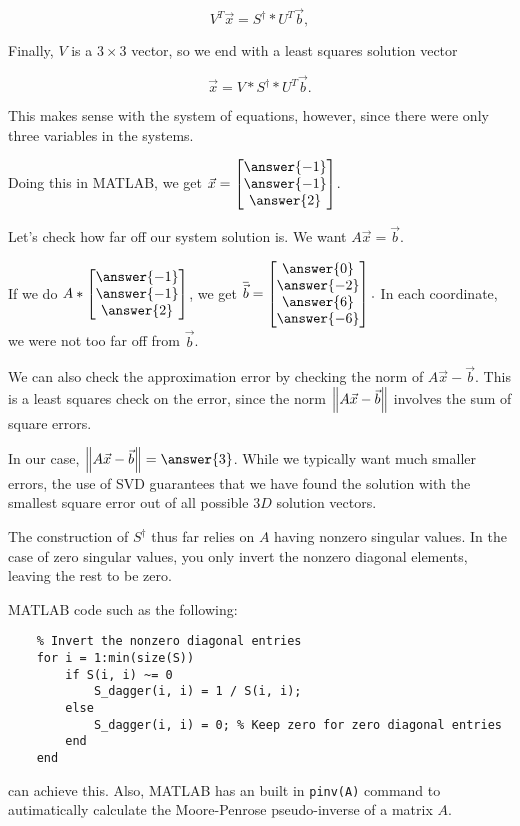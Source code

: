 \documentclass{ximera}
\begin{document}
\begin{example}
$$V^T\vec{x}=S^\dagger*U^T\vec{b},$$

Finally, $V$ is a $3\times 3$ vector, so we end with a least squares solution vector

$$\vec{x}=V*S^\dagger*U^T\vec{b}.$$

This makes sense with the system of equations, however, since there were only three variables in the systems. 

Doing this in MATLAB, we get $\vec{x}=\begin{bmatrix}
  \answer{-1}\\\answer{-1}\\\answer{2}
\end{bmatrix}$. 

Let's check how far off our system solution is. We want $A\vec{x}=\vec{b}$. 

If we do \( A*\begin{bmatrix}
  \answer{-1}\\\answer{-1}\\\answer{2}
\end{bmatrix} \), we get \( \overline{\vec{b}}=\begin{bmatrix}
  \answer{0}\\\answer{-2}\\\answer{6}\\\answer{-6}
\end{bmatrix}. \) In each coordinate, we were not too far off from $\vec{b}$. 



We can also check the approximation error by checking the norm of $A\vec{x}-\vec{b}$. This is a least squares check on the error, since the norm $\left\|A\vec{x}-\vec{b}\right\|$ involves the sum of square errors. 

In our case, $\norm{A\vect{x}-\vect{b}}=\answer{3}$. While we typically want much smaller errors, the use of SVD guarantees that we have found the solution with the smallest square error out of all possible $3D$ solution vectors. 

\end{example}

\begin{remark}

  The construction of $S^\dagger$ thus far relies on $A$ having nonzero singular values. In the case of zero singular values, you only invert the nonzero diagonal elements, leaving the rest to be zero. 

  MATLAB code such as the following:

  \begin{verbatim}
    % Invert the nonzero diagonal entries
    for i = 1:min(size(S))
        if S(i, i) ~= 0
            S_dagger(i, i) = 1 / S(i, i);
        else
            S_dagger(i, i) = 0; % Keep zero for zero diagonal entries
        end
    end
  \end{verbatim}

  can achieve this. Also, MATLAB has an built in \texttt{pinv(A)} command to autimatically calculate the Moore-Penrose pseudo-inverse of a matrix $A$.

\end{remark}
\end{document}
